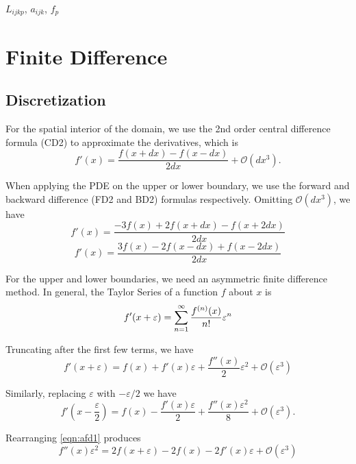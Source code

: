 $L_{ijkp}$, $a_{ijk}$, $f_p$

\section{Finite Difference}

\subsection{Discretization}

For the spatial interior of the domain, we use the 2nd order central difference formula (CD2) to approximate the derivatives, which is
\begin{equation}
    \tag{CD2}
    f'(x) = \frac{f(x+dx)-f(x-dx)}{2dx} + \mathcal{O}(dx^3).
\end{equation}

When applying the PDE on the upper or lower boundary, we use the forward and backward difference (FD2 and BD2) formulas respectively.
Omitting $\mathcal{O}(dx^3)$, we have
\begin{equation}
    \tag{FD2}
    \label{eq:FD2}
    f'(x) = \frac{-3f(x)+2f(x+dx)-f(x+2dx)}{2dx}
\end{equation}
\begin{equation}
    \tag{BD2}
    \label{eq:BD2}
    f'(x) = \frac{3f(x)-2f(x-dx)+f(x-2dx)}{2dx}
\end{equation}

For the upper and lower boundaries, we need an asymmetric finite difference
method.
In general, the Taylor Series of a function $f$ about $x$ is
\begin{equation}
  f'(x+\varepsilon) = \sum_{n=1}^\infty \frac{f^{(n)}(x)}{n!} \varepsilon^n \\
\end{equation}

Truncating after the first few terms, we have
\begin{equation}
  \label{eqn:afd1}
  f'(x+\varepsilon)  = f(x) + f'(x)\varepsilon + \frac{f''(x)}{2}\varepsilon^2 + \mathcal{O}(\varepsilon^3)
\end{equation}

Similarly, replacing $\varepsilon$ with $-\varepsilon/2$ we have
\begin{equation}
  \label{eqn:afd2}
  f'(x-\frac{\varepsilon}{2}) = f(x) - \frac{f'(x)\varepsilon}{2} + \frac{f''(x)\varepsilon^2}{8} + \mathcal{O}(\varepsilon^3).
\end{equation}

Rearranging \eqref{eqn:afd1} produces
\begin{equation}
  \label{eqn:afd3}
  f''(x)\varepsilon^2 = 2f(x+\varepsilon) - 2f(x) - 2f'(x)\varepsilon + \mathcal{O}(\varepsilon^3)
\end{equation}

